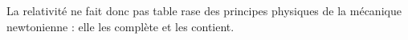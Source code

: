 La relativité ne fait donc pas table rase des principes physiques de la mécanique newtonienne : elle les complète et les contient.


